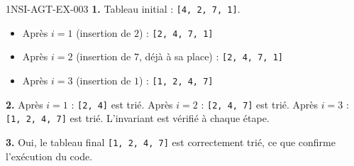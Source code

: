 \begin{corrige}{1NSI-AGT-EX-003}
\textbf{1.} Tableau initial : \lstinline{[4, 2, 7, 1]}.
\begin{itemize}
  \item Après $i=1$ (insertion de $2$) : \lstinline{[2, 4, 7, 1]}
  \item Après $i=2$ (insertion de $7$, déjà à sa place) : \lstinline{[2, 4, 7, 1]}
  \item Après $i=3$ (insertion de $1$) : \lstinline{[1, 2, 4, 7]}
\end{itemize}

\textbf{2.} Après $i=1$ : \lstinline{[2, 4]} est trié. Après $i=2$ : \lstinline{[2, 4, 7]}
est trié. Après $i=3$ : \lstinline{[1, 2, 4, 7]} est trié. L'invariant est vérifié à
chaque étape.

\textbf{3.} Oui, le tableau final \lstinline{[1, 2, 4, 7]} est correctement trié, ce que
confirme l'exécution du code.
\end{corrige}
